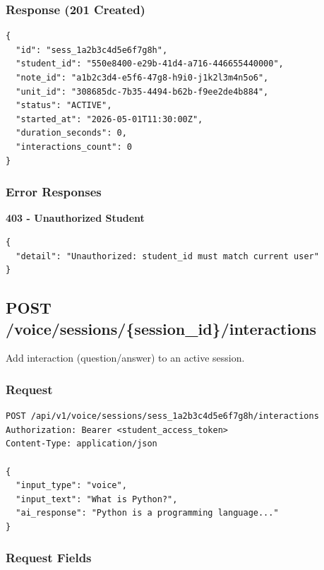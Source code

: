 \documentclass[12pt,a4paper,oneside]{article}
\begin{document}
\subsubsection{Response (201 Created)}

\begin{lstlisting}
{
  "id": "sess_1a2b3c4d5e6f7g8h",
  "student_id": "550e8400-e29b-41d4-a716-446655440000",
  "note_id": "a1b2c3d4-e5f6-47g8-h9i0-j1k2l3m4n5o6",
  "unit_id": "308685dc-7b35-4494-b62b-f9ee2de4b884",
  "status": "ACTIVE",
  "started_at": "2026-05-01T11:30:00Z",
  "duration_seconds": 0,
  "interactions_count": 0
}
\end{lstlisting}

\subsubsection{Error Responses}

\begin{tcolorbox}[colback=lightred, colframe=darkblue]
\textbf{403 - Unauthorized Student}
\begin{lstlisting}
{
  "detail": "Unauthorized: student_id must match current user"
}
\end{lstlisting}
\end{tcolorbox}

\subsection{POST /voice/sessions/\{session\_id\}/interactions}

Add interaction (question/answer) to an active session.

\subsubsection{Request}

\begin{lstlisting}
POST /api/v1/voice/sessions/sess_1a2b3c4d5e6f7g8h/interactions
Authorization: Bearer <student_access_token>
Content-Type: application/json

{
  "input_type": "voice",
  "input_text": "What is Python?",
  "ai_response": "Python is a programming language..."
}
\end{lstlisting}

\subsubsection{Request Fields}
\end{document}

